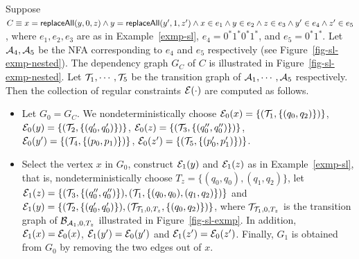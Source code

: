 



\begin{example}
Suppose $C \equiv x= \mathsf{replaceAll}(y, 0, z) \wedge y = \mathsf{replaceAll}(y', 1, z') \wedge x \in e_1 \wedge y \in e_2 \wedge z \in e_3 \wedge y' \in e_4  \wedge z' \in e_5$, where $e_1, e_2, e_3$ are as in Example~\ref{exmp-sl}, $e_4=0^* 1^* 0^* 1^*$, and $e_5=0^*1^*$. Let $\mathcal{A}_4,\mathcal{A}_5$ be the NFA corresponding to $e_4$ and $e_5$ respectively (see Figure~\ref{fig-sl-exmp-nested}). The dependency graph $G_C$ of $C$ is illustrated in Figure~\ref{fig-sl-exmp-nested}. Let $\mathcal{T}_1,\cdots, \mathcal{T}_5$ be the transition graph of $\mathcal{A}_1,\cdots, \mathcal{A}_5$ respectively. Then the collection of regular constraints $\mathcal{E}(\cdot)$ are computed as follows. 
\begin{itemize}
\item Let $G_0=G_C$. We nondeterministically choose $\mathcal{E}_0(x) = \{(\mathcal{T}_1, \{(q_0, q_2)\})\}$, $\mathcal{E}_0(y) = \{(\mathcal{T}_2, \{(q^\prime_0, q^\prime_0)\})\}$, $\mathcal{E}_0(z) = \{(\mathcal{T}_3, \{(q^{\prime\prime}_0, q^{\prime\prime}_0)\})\}$, $\mathcal{E}_0(y^\prime) = \{(\mathcal{T}_4, \{(p_0, p_1)\})\}$, $\mathcal{E}_0(z^\prime) = \{(\mathcal{T}_5, \{(p^{\prime}_0, p^{\prime}_1)\})\}$.
%
\item Select the vertex $x$ in $G_0$, construct $\mathcal{E}_1(y)$ and $\mathcal{E}_1(z)$ as in Example~\ref{exmp-sl}, that is, nondeterministically choose $T_z =\{(q_0, q_0), (q_1,q_2)\}$, let $\mathcal{E}_1(z) = \{(\mathcal{T}_3, \{(q^{\prime\prime}_0, q^{\prime\prime}_0)\}), (\mathcal{T}_1, \{(q_0,q_0), (q_1, q_2)\})\}$ and $\mathcal{E}_1(y)=\{(\mathcal{T}_2, \{(q^\prime_0, q^\prime_0)\}), (\mathcal{T}_{\mathcal{T}_1, 0, T_z}, \{(q_0,q_2)\})\}$, where $\mathcal{T}_{\mathcal{T}_1, 0, T_z}$ is the transition graph of $\mathcal{B}_{\mathcal{A}_1, 0, T_z}$ illustrated in Figure~\ref{fig-sl-exmp}. In addition, $\mathcal{E}_1(x)=\mathcal{E}_0(x)$, $\mathcal{E}_1(y')=\mathcal{E}_0(y')$ and $\mathcal{E}_1(z')=\mathcal{E}_0(z')$. Finally, $G_1$ is obtained from $G_0$ by removing the two edges out of $x$.

\end{itemize}
\end{example}
